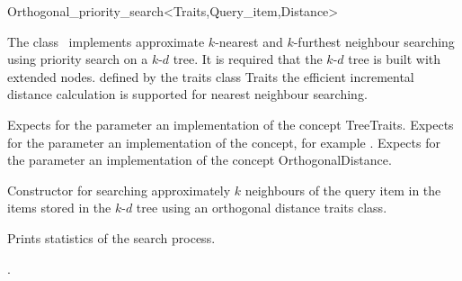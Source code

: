 

\begin{ccRefClass}{Orthogonal_priority_search<Traits,Query_item,Distance>}  %


\ccDefinition

The class \ccRefName\ implements approximate $k$-nearest and $k$-furthest neighbour searching
using priority search on a $k$-$d$ tree. It is required that the $k$-$d$ tree is
built with extended nodes.
defined by the traits class Traits the efficient incremental distance calculation is supported
for nearest neighbour searching.


\ccParameters

Expects for the parameter  an implementation of the concept TreeTraits.
Expects for the parameter   an implementation of the
 concept, for example .
Expects for the parameter  an implementation of the concept OrthogonalDistance.

\ccTypes



\ccCreation
{}  %

{Constructor for searching approximately $k$ neighbours of the query item 
in the items stored in the $k$-$d$ tree  using an orthogonal distance
traits class.}




{
Prints statistics of the search process.
}

\ccSeeAlso

.

\end{ccRefClass}


